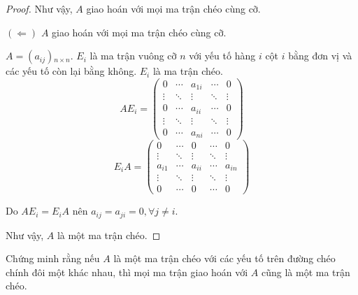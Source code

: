 \begin{proof}
    Như vậy, $A$ giao hoán với mọi ma trận chéo cùng cỡ.
    
    $(\Leftarrow)$ $A$ giao hoán với mọi ma trận chéo cùng cỡ.
    
    $A = (a_{ij}){}_{n\times n}$. $E_{i}$ là ma trận vuông cỡ $n$ với yếu tố hàng $i$ cột $i$ bằng đơn vị và các yếu tố còn lại bằng không. $E_{i}$ là ma trận chéo.
    \[
        AE_{i} =
        \begin{pmatrix}
            0      & \cdots & a_{1i} & \cdots & 0      \\
            \vdots & \ddots & \vdots & \ddots & \vdots \\
            0      & \cdots & a_{ii} & \cdots & 0      \\
            \vdots & \ddots & \vdots & \ddots & \vdots \\
            0      & \cdots & a_{ni} & \cdots & 0
        \end{pmatrix}
    \]
    \[
        E_{i}A =
        \begin{pmatrix}
            0      & \cdots & 0      & \cdots & 0      \\
            \vdots & \ddots & \vdots & \ddots & \vdots \\
            a_{i1} & \cdots & a_{ii} & \cdots & a_{in} \\
            \vdots & \ddots & \vdots & \ddots & \vdots \\
            0      & \cdots & 0      & \cdots & 0
        \end{pmatrix}
    \]
    
    Do $AE_{i} = E_{i}A$ nên $a_{ij} = a_{ji} = 0, \forall j\ne i$.
    
    Như vậy, $A$ là một ma trận chéo.
\end{proof}

\begin{exercise}
    Chứng minh rằng nếu $A$ là một ma trận chéo với các yếu tố trên đường chéo chính đôi một khác nhau, thì mọi ma trận giao hoán với $A$ cũng là một ma trận chéo.
\end{exercise}

